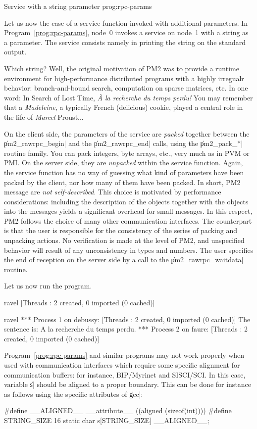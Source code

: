  {Service with a string
  parameter} {prog:rpc-params}

Let us now the case of a service function invoked with additional
parameters. In Program~\ref{prog:rpc-params}, node~0 invokes a service
on node~1 with a string as a parameter. The service consists namely in
printing the string on the standard output.
  
Which string? Well, the original motivation of PM2 was to provide a
runtime environment for high-performance distributed programs with a
highly irregualr behavior: branch-and-bound search, computation on
sparse matrices, etc. In one word: In Search of Lost Time, \emph{\`A
  la recherche du temps perdu!} You may remember that a
\emph{Madeleine}, a typically French (delicious) cookie, played a
central role in the life of \emph{Marcel} Proust...
  
On the client side, the parameters of the service are \emph{packed}
together between the \|pm2_rawrpc_begin| and the \|pm2_rawrpc_end|
calls, using the \|pm2_pack_*| routine family. You can pack integers,
byte arrays, etc., very much as in PVM or PMI.  On the server side,
they are \emph{unpacked} within the service function.  Again, the
service function has no way of guessing what kind of parameters have
been packed by the client, nor how many of them have been packed. In
short, PM2 message are \emph{not self-described}.  This choice is
motivated by performance considerations: including the description of
the objects together with the objects into the messages yields a
significant overhead for small messages. In this respect, PM2 follows
the choice of many other communication interfaces. The counterpart is
that the user is responsible for the consistency of the series of
packing and unpacking actions. No verification is made at the level of
PM2, and unspecified behavior will result of any unconsistency in
types and numbers. The user specifies the end of reception on the
server side by a call to the \|pm2_rawrpc_waitdata| routine.

Let us now run the program.
\begin{shell}
ravel%
[Threads : 2 created, 0 imported (0 cached)]

ravel%
*** Process 1 on debussy:
[Threads : 2 created, 0 imported (0 cached)]
The sentence is: A la recherche du temps perdu.
*** Process 2 on faure:
[Threads : 2 created, 0 imported (0 cached)]
\end{shell}

\begin{warning}
  Program~\ref{prog:rpc-params} and similar programs may not work
  properly when used with communication interfaces which require some
  specific alignment for communication buffers: for instance,
  BIP/Myrinet and SISCI/SCI. In this case, variable \|s| should
  be aligned to a proper boundary. This can be done for instance as
  follows using the specific attributes of \|gcc|:
\begin{program}
#define __ALIGNED__ __attribute__ ((aligned (sizeof(int))))
#define STRING_SIZE  16
static char s[STRING_SIZE] __ALIGNED__;
\end{program}
\end{warning}

